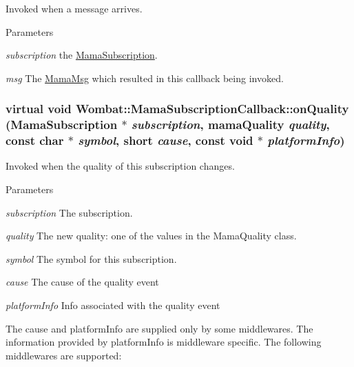 Invoked when a message arrives. 
\begin{DoxyParams}{Parameters}
\item[{\em subscription}]the {\ttfamily \hyperlink{classWombat_1_1MamaSubscription}{MamaSubscription}}. \item[{\em msg}]The \hyperlink{classWombat_1_1MamaMsg}{MamaMsg} which resulted in this callback being invoked. \end{DoxyParams}
\hypertarget{classWombat_1_1MamaSubscriptionCallback_a3883b459581434f2d171fd9938eb5d57}{
\subsubsection[{onQuality}]{\setlength{\rightskip}{0pt plus 5cm}virtual void Wombat::MamaSubscriptionCallback::onQuality ({\bf MamaSubscription} $\ast$ {\em subscription}, \/  mamaQuality {\em quality}, \/  const char $\ast$ {\em symbol}, \/  short {\em cause}, \/  const void $\ast$ {\em platformInfo})}}
\label{classWombat_1_1MamaSubscriptionCallback_a3883b459581434f2d171fd9938eb5d57}


Invoked when the quality of this subscription changes. 
\begin{DoxyParams}{Parameters}
\item[{\em subscription}]The subscription. \item[{\em quality}]The new quality: one of the values in the MamaQuality class. \item[{\em symbol}]The symbol for this subscription. \item[{\em cause}]The cause of the quality event \item[{\em platformInfo}]Info associated with the quality event\end{DoxyParams}
The cause and platformInfo are supplied only by some middlewares. The information provided by platformInfo is middleware specific. The following middlewares are supported:

